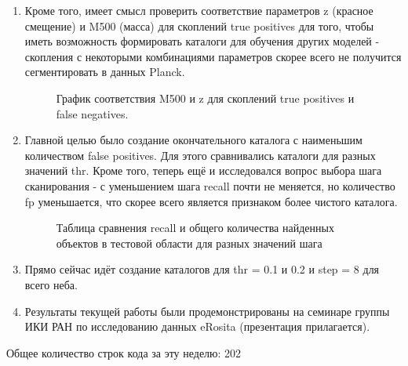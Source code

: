 \documentclass{article}
\begin{document}
\begin{enumerate}
    \item Кроме того, имеет смысл проверить соответствие параметров z (красное смещение) и M500 
        (масса) для скоплений true positives для того, чтобы иметь возможность формировать каталоги 
        для обучения других моделей - скопления с некоторыми комбинациями параметров скорее всего не 
        получится сегментировать в данных Planck.\\

    \begin{figure}[h]
        \caption{График соответствия M500 и z для скоплений true positives и false negatives.}
    \end{figure}

    \item Главной целью было создание окончательного каталога с наименьшим количеством false 
        positives. Для этого сравнивались каталоги для разных значений thr. Кроме того, теперь 
        ещё и исследовался вопрос выбора шага сканирования - с уменьшением шага recall почти не 
        меняется, но количество fp уменьшается, что скорее всего является признаком более чистого 
        каталога.\\

    
    \begin{figure}[h]
        \caption{Таблица сравнения recall и общего количества найденных объектов в тестовой области
        для разных значений шага}
    \end{figure}

    \item Прямо сейчас идёт создание каталогов для thr = 0.1 и 0.2 и step = 8 для всего неба.\\ 
    \item Результаты текущей работы были продемонстрированы на семинаре группы ИКИ РАН по исследованию 
        данных eRosita (презентация прилагается). \\ 

\end{enumerate}

Общее количество строк кода за эту неделю: 202\\
\end{document}
